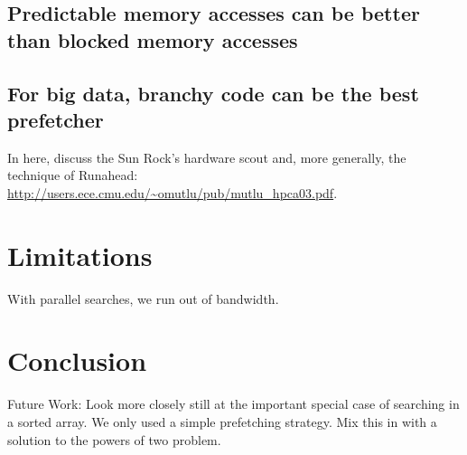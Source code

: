 \documentclass{patmorin}
\begin{document}
\subsection{Predictable memory accesses can be better than blocked
            memory accesses}

\subsection{For big data, branchy code can be the best prefetcher}

In here, discuss the Sun Rock's hardware scout and, more generally, the technique of Runahead: \url{http://users.ece.cmu.edu/~omutlu/pub/mutlu_hpca03.pdf}.

\section{Limitations}

With parallel searches, we run out of bandwidth.

\section{Conclusion}

Future Work: Look more closely still at the important special case of searching
in a sorted array. We only used a simple prefetching strategy. Mix this
in with a solution to the powers of two problem.
\end{document}
